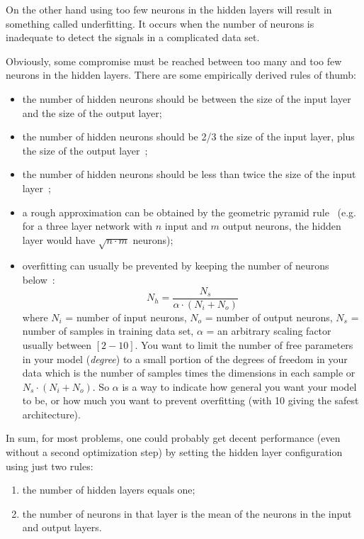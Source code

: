 \documentclass[]{scrartcl}
\begin{document}
On the other hand using too few neurons in the hidden layers will result in something called underfitting. It occurs when the number of neurons is inadequate to detect the signals in a complicated data set.

Obviously, some compromise must be reached between too many and too few neurons in the hidden layers. There are some empirically derived rules of thumb:
\begin{itemize}
\item the number of hidden neurons should be between the size of the input layer and the size of the output layer;
\item the number of hidden neurons should be 2/3 the size of the input layer, plus the size of the output layer~\cite{bib:heaton};
\item the number of hidden neurons should be less than twice the size of the input layer~\cite{bib:heaton};
\item a rough approximation can be obtained by the geometric pyramid rule~\cite{bib:master} (e.g. for a three layer network with $n$ input and $m$ output neurons, the hidden layer would have $\sqrt{n\cdot m}$ neurons);
\item overfitting can usually be prevented by keeping the number of neurons below~\cite{bib:hagan}:
\begin{equation}
N_h = \frac{N_s}{\alpha\cdot(N_i+N_o)}
\end{equation}
where $N_i$ = number of input neurons, $N_o$ = number of output neurons, $N_s$ = number of samples in training data set, $\alpha$ = an arbitrary scaling factor usually between $[2-10]$. 
You want to limit the number of free parameters in your model (\emph{degree}) to a small portion of the degrees of freedom in your data which is the number of samples times the  dimensions in each sample or $N_s\cdot(N_i+N_o)$. So $\alpha$ is a way to indicate how general you want your model to be, or how much you want to prevent overfitting (with 10 giving the safest architecture).
\end{itemize}

In sum, for most problems, one could probably get decent performance (even without a second optimization step) by setting the hidden layer configuration using just two rules:
\begin{enumerate}
\item the number of hidden layers equals one; 
\item the number of neurons in that layer is the mean of the neurons in the input and output layers.
\end{enumerate}
\end{document}
